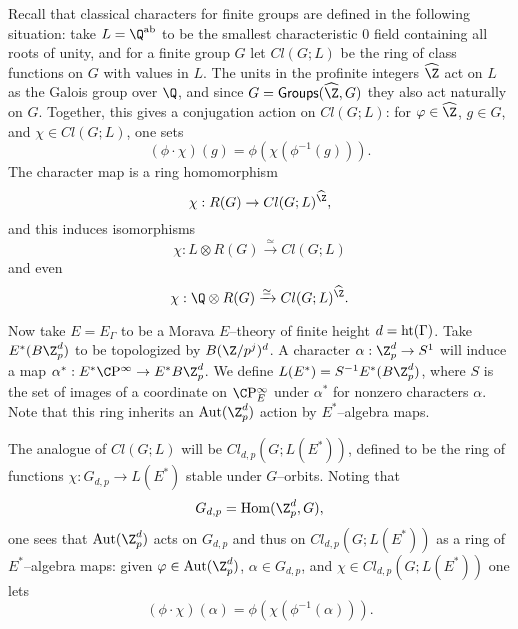 Recall that classical characters for finite groups are defined in the following situation: take $L = \Q^{\mathrm{ab}}$ to be the smallest characteristic $0$ field containing all roots of unity, and for a finite group $G$ let $Cl(G; L)$ be the ring of class functions on $G$ with values in $L$.  The units in the profinite integers $\widehat{\Z}$ act on $L$ as the Galois group over $\Q$, and since $G = \CatOf{Groups}(\widehat{\Z}, G)$ they also act naturally on $G$.  Together, this gives a conjugation action on $Cl(G; L)$: for $\phi \in \widehat{\Z}$, $g \in G$, and $\chi \in Cl(G; L)$, one sets \[(\phi \cdot \chi)(g) = \phi(\chi(\phi^{-1}(g))).\]  The character map is a ring homomorphism \[\chi: R(G) \to Cl(G; L)^{\widehat{\Z}},\] and this induces isomorphisms \[\chi: L \otimes R(G) \xrightarrow{\simeq} Cl(G; L)\] and even \[\chi: \Q \otimes R(G) \xrightarrow{\simeq} Cl(G; L)^{\widehat{\Z}}.\]

Now take $E = E_\Gamma$ to be a Morava $E$--theory of finite height $d = \operatorname{ht}(\Gamma)$.  Take $E^*(B\Z_p^d)$ to be topologized by $B(\Z/p^j)^d$.  A character $\alpha: \Z_p^d \to S^1$ will induce a map $\alpha^*: E^* \CP^\infty \to E^* B\Z_p^d$.  We define $L(E^*) = S^{-1} E^*(B\Z_p^d)$, where $S$ is the set of images of a coordinate on $\CP^\infty_E$ under $\alpha^*$ for nonzero characters $\alpha$.  Note that this ring inherits an $\operatorname{Aut}(\Z_p^d)$ action by $E^*$--algebra maps.

The analogue of $Cl(G; L)$ will be $Cl_{d,p}(G; L(E^*))$, defined to be the ring of functions $\chi: G_{d, p} \to L(E^*)$ stable under $G$--orbits.  Noting that \[G_{d,p} = \operatorname{Hom}(\Z_p^d, G),\] one sees that $\operatorname{Aut}(\Z_p^d)$ acts on $G_{d,p}$ and thus on $Cl_{d,p}(G; L(E^*))$ as a ring of $E^*$--algebra maps: given $\phi \in \operatorname{Aut}(\Z_p^d)$, $\alpha \in G_{d,p}$, and $\chi \in Cl_{d,p}(G; L(E^*))$ one lets \[(\phi \cdot \chi)(\alpha) = \phi(\chi(\phi^{-1}(\alpha))).\]

